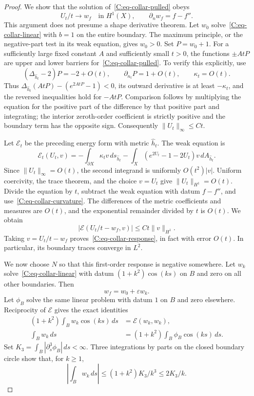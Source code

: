 \begin{proof}
We show that the solution of~\eqref{C:eq-collar-pulled} obeys
\begin{equation}
 U_t/t\longrightarrow w_f\quad\text{in }H^1(X),
 \qquad \partial_nw_f=f-f''.
 \label{C:eq-collar-response}
\end{equation}
This argument does not presume a shape derivative theorem. Let $w_0$ solve~\eqref{C:eq-collar-linear} with $b=1$ on the entire boundary. The maximum principle, or the negative-part test in its weak equation, gives $w_0>0$. Set $P=w_0+1$. For a sufficiently large fixed constant $A$ and sufficiently small $t>0$, the functions $\pm AtP$ are upper and lower barriers for~\eqref{C:eq-collar-pulled}. To verify this explicitly, use
\[
 (\Delta_{\widehat h_t}-2)P=-2+O(t),
 \qquad \partial_{n_t}P=1+O(t),
 \qquad \kappa_t=O(t).
\]
Thus $\Delta_{\widehat h_t}(AtP)-(e^{2AtP}-1)<0$, its outward derivative is at least $-\kappa_t$, and the reversed inequalities hold for $-AtP$. Comparison follows by multiplying the equation for the positive part of the difference by that positive part and integrating; the interior zeroth-order coefficient is strictly positive and the boundary term has the opposite sign. Consequently $\|U_t\|_\infty\le Ct$.

Let $\mathcal E_t$ be the preceding energy form with metric $\widehat h_t$. The weak equation is
\[
 \mathcal E_t(U_t,v)
 =-\int_{\partial X}\kappa_t v\,ds_{\widehat h_t}
  -\int_X(e^{2U_t}-1-2U_t)v\,dA_{\widehat h_t}.
\]
Since $\|U_t\|_\infty=O(t)$, the second integrand is uniformly $O(t^2)|v|$. Uniform coercivity, the trace theorem, and the choice $v=U_t$ give $\|U_t\|_{H^1}=O(t)$. Divide the equation by $t$, subtract the weak equation with datum $f-f''$, and use~\eqref{C:eq-collar-curvature}. The differences of the metric coefficients and measures are $O(t)$, and the exponential remainder divided by $t$ is $O(t)$. We obtain
\[
 |\mathcal E(U_t/t-w_f,v)|\le Ct\|v\|_{H^1}.
\]
Taking $v=U_t/t-w_f$ proves~\eqref{C:eq-collar-response}, in fact with error $O(t)$. In particular, its boundary traces converge in $L^2$.

We now choose $N$ so that this first-order response is negative somewhere. Let $w_k$ solve~\eqref{C:eq-collar-linear} with datum $(1+k^2)\cos(ks)$ on $B$ and zero on all other boundaries. Then
\[
 w_f=w_0+\varepsilon w_k.
\]
Let $\phi_B$ solve the same linear problem with datum $1$ on $B$ and zero elsewhere. Reciprocity of $\mathcal E$ gives the exact identities
\begin{align}
 (1+k^2)\int_Bw_k\cos(ks)\,ds
   &=\mathcal E(w_k,w_k),\label{C:eq-collar-fourier-energy}\\
 \int_Bw_k\,ds
   &=(1+k^2)\int_B\phi_B\cos(ks)\,ds.
   \label{C:eq-collar-mean}
\end{align}
Set $K_3=\int_B|\partial_s^3\phi_B|\,ds<\infty$. Three integrations by parts on the closed boundary circle show that, for $k\ge1$,
\begin{equation}
 \left|\int_Bw_k\,ds\right|
 \le (1+k^2)K_3/k^3\le2K_3/k.
 \label{C:eq-collar-mean-bound}
\end{equation}


\end{proof}
